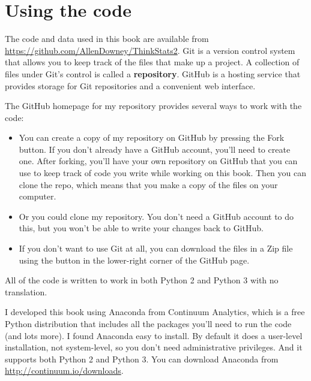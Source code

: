 \documentclass[12pt]{book}
\theoremstyle{exercise}
\begin{document}
\section{Using the code}%
\label{code}

The code and data used in this book are available from
\url{https://github.com/AllenDowney/ThinkStats2}.  Git is a version
control system that allows you to keep track of the files that
make up a project.  A collection of files under Git's control is
called a {\bf repository}.  GitHub is a hosting service that provides
storage for Git repositories and a convenient web interface.%
%
%

The GitHub homepage for my repository provides several ways to
work with the code:

\begin{itemize}

\item You can create a copy of my repository
on GitHub by pressing the {\sf Fork} button.  If you don't already
have a GitHub account, you'll need to create one.  After forking, you'll
have your own repository on GitHub that you can use to keep track
of code you write while working on this book.  Then you can
clone the repo, which means that you make a copy of the files
on your computer.%

\item Or you could clone
my repository.  You don't need a GitHub account to do this, but you
won't be able to write your changes back to GitHub.%

\item If you don't want to use Git at all, you can download the files
in a Zip file using the button in the lower-right corner of the
GitHub page.

\end{itemize}

All of the code is written to work in both Python 2 and Python 3
with no translation.

I developed this book using Anaconda from
Continuum Analytics, which is a free Python distribution that includes
all the packages you'll need to run the code (and lots more).
I found Anaconda easy to install.  By default it does a user-level
installation, not system-level, so you don't need administrative
privileges.  And it supports both Python 2 and Python 3.  You can
download Anaconda from \url{http://continuum.io/downloads}.%
\end{document}
